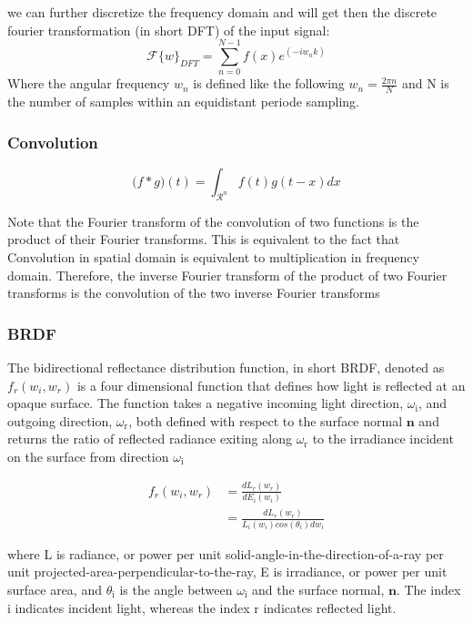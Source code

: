 we can further discretize the frequency domain and will get then the discrete fourier transformation (in short DFT) of the input signal:
\begin{equation}
  \mathcal{F}\{w\}_{DFT} = \sum_{n=0}^{N-1} f(x) e^(-iw_{n}k)
\end{equation}
Where the angular frequency $w_n$ is defined like the following $w_n = \frac{2\pi n}{N}$ and N is the number of samples within an equidistant periode sampling.

\subsubsection{Convolution}

\begin{equation}
  \mathcal (f*g)(t) = \int_{\mathcal{R}^n} f(t)g(t-x) dx
\end{equation}

Note that the Fourier transform of the convolution of two functions is the product of their Fourier transforms. This is equivalent to the fact that Convolution in spatial domain is equivalent to multiplication in frequency domain. Therefore, the inverse Fourier transform of the product of two Fourier transforms is the convolution of the two inverse Fourier transforms

\subsubsection{BRDF}
The bidirectional reflectance distribution function, in short BRDF, denoted as $f_r(w_i, w_r)$ is a four dimensional function that defines how light is reflected at an opaque surface. The function takes a negative incoming light direction, $\omega_{\text{i}}$, and outgoing direction, $\omega_{\text{r}}$, both defined with respect to the surface normal $\mathbf{n}$ and returns the ratio of reflected radiance exiting along $\omega_{\text{r}}$ to the irradiance incident on the surface from direction $\omega_{\text{i}}$
  
\begin{align}
  f_r(w_i, w_r)
  & = \frac{dL_r(w_r)}{dE_i(w_i)} \\
  & = \frac{dL_r(w_r)}{L_i(w_i)cos(\theta_i)dw_i}
\end{align}

where L is radiance, or power per unit solid-angle-in-the-direction-of-a-ray per unit projected-area-perpendicular-to-the-ray, E is irradiance, or power per unit surface area, and $\theta_{\text{i}}$ is the angle between $\omega_{\text{i}}$ and the surface normal, $\mathbf n$. The index $\text{i}$ indicates incident light, whereas the index $\text{r}$ indicates reflected light.

